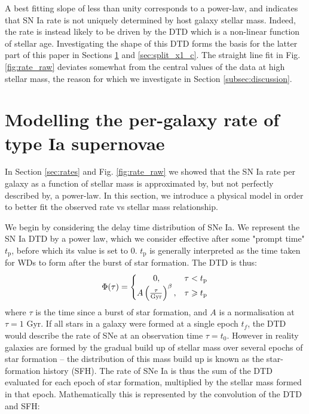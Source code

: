 \documentclass[fleqn,usenatbib]{mnras}
\begin{document}
A best fitting slope of less than unity corresponds to a power-law, and indicates that SN Ia rate is not uniquely determined by host galaxy stellar mass. Indeed, the rate is instead likely to be driven by the DTD which is a non-linear function of stellar age. Investigating the shape of this DTD forms the basis for the latter part of this paper in Sections \ref{sec:model} and \ref{sec:split_x1_c}. The straight line fit in Fig. \ref{fig:rate_raw} deviates somewhat from the central values of the data at high stellar mass, the reason for which we investigate in Section \ref{subsec:discussion}.

\section{Modelling the per-galaxy rate of type Ia supernovae}
 \label{sec:model}
 
In Section \ref{sec:rates} and Fig. \ref{fig:rate_raw} we showed that the SN Ia rate per galaxy as a function of stellar mass is approximated by, but not perfectly described by, a power-law. In this section, we introduce a physical model in order to better fit the observed rate vs stellar mass relationship. 

We begin by considering the delay time distribution of SNe Ia.
We represent the SN Ia DTD by a power law, which we consider effective after some "prompt time" $t_{\mathrm{p}}$, before which its value is set to 0. $t_{\mathrm{p}}$ is generally interpreted as the time taken for WDs to form after the burst of star formation. The DTD is thus:
\begin{equation}
 \Phi(\tau) = \left\{
    \begin{array}{@{}cc@{}}
    0 , & \tau < t_{\mathrm{p}} \\
    A\left(\frac{\tau}{\mathrm{Gyr}}\right)^{\beta} , & \tau \geq t_{\mathrm{p}}
    \end{array}\right.
        \label{eq:dtd}
\end{equation} 
where $\tau$ is the time since a burst of star formation, and $A$ is a normalisation at $\tau=1$ Gyr. If all stars in a galaxy were formed at a single epoch $t_f$, the DTD would describe the rate of SNe at an observation time $\tau = t_0$. However in reality galaxies are formed by the gradual build up of stellar mass over several epochs of star formation -- the distribution of this mass build up is known as the star-formation history (SFH). The rate of SNe Ia is thus the sum of the DTD evaluated for each epoch of star formation, multiplied by the stellar mass formed in that epoch. Mathematically this is represented by the convolution of the DTD and SFH:
 
\end{document}
